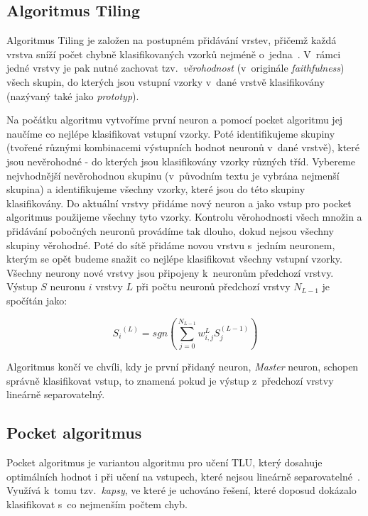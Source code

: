 \documentclass[a4paper, 11pt]{article}
\begin{document}
\subsection{Algoritmus Tiling}
Algoritmus Tiling je založen na postupném přidávání vrstev, přičemž každá vrstva sníží počet chybně klasifikovaných vzorků nejméně o~jedna~\cite{mezard}. V~rám\-ci jedné vrstvy je pak nutné zachovat tzv.\ \emph{věrohodnost} (v~originále \emph{faithfulness}) všech skupin, do kterých jsou vstupní vzorky v~dané vrstvě klasifikovány (nazývaný také jako \emph{prototyp}).

Na počátku algoritmu vytvoříme první neuron a pomocí pocket algoritmu jej naučíme co nejlépe klasifikovat vstupní vzorky. Poté identifikujeme skupiny (tvořené různými kombinacemi výstupních hodnot neuronů v~dané vrstvě), které jsou nevěrohodné - do kterých jsou klasifikovány vzorky různých tříd. Vybereme nejvhodnější nevěrohodnou skupinu (v~původním textu je vybrána nejmenší skupina) a identifikujeme všechny vzorky, které jsou do této skupiny klasifikovány. Do aktuální vrstvy přidáme nový neuron a jako vstup pro pocket algoritmus použijeme všechny tyto vzorky. Kontrolu vě\-ro\-hod\-nos\-ti všech množin a přidávání pobočných neuronů provádíme tak dlouho, dokud nejsou všechny skupiny věrohodné. Poté do sítě přidáme novou vrstvu s~jedním neuronem, kterým se opět budeme snažit co nejlépe klasifikovat všechny vstupní vzorky. Všechny neurony nové vrstvy jsou při\-po\-je\-ny k~neuronům předchozí vrstvy. Výstup $S$ neuronu $i$ vrstvy $L$ při počtu neuronů předchozí vrstvy $N_{L-1}$ je spočítán jako:

\begin{equation*}
  {S_i}^{(L)}=sgn\left(\sum_{j=0}^{N_{L-1}} w_{i,j}^{L}S_{j}^{(L-1)}\right)
\end{equation*}

Algoritmus končí ve chvíli, kdy je první přidaný neuron, \emph{Master} neuron, schopen správně klasifikovat vstup, to znamená pokud je výstup z~předchozí vrstvy lineárně separovatelný.

\subsection{Pocket algoritmus}
Pocket algoritmus je variantou algoritmu pro učení TLU, který dosahuje optimálních hodnot i při učení na vstupech, které nejsou lineárně separovatelné~\cite{ranka}. Využívá k~tomu tzv.\ \emph{kapsy}, ve které je uchováno řešení, které doposud dokázalo klasifikovat s~co nejmenším počtem chyb.
\end{document}
